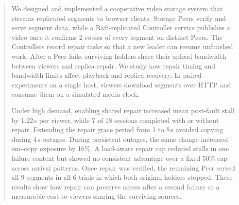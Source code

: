 \begin{abstract}
We designed and implemented a cooperative video storage system that
streams replicated segments to browser clients. Storage Peers verify
and serve segment data, while a Raft-replicated Controller service
publishes a video once it confirms 2 copies of every segment on distinct
Peers. The Controllers record repair tasks so that a new leader can
resume unfinished work. After a Peer fails, surviving holders share their
upload bandwidth between viewers and replica repair. We study how repair
timing and bandwidth limits affect playback and replica recovery.
In paired experiments on a single host, viewers download segments
over HTTP and consume them on a simulated media clock.

Under high demand, enabling shared repair increased mean post-fault stall
by 1.22\,s per viewer, while 7 of 18 sessions completed with or without
repair. Extending the repair grace period from 1 to 8\,s avoided copying
during 4\,s outages. During persistent outages, the same change increased
one-copy exposure by 16\%. A load-aware repair cap reduced stalls in one
failure context but showed no consistent advantage over a fixed 50\% cap
across arrival patterns. Once repair was verified, the remaining Peer
served all 9 segments in all 6 trials in which both original holders
stopped. These results show how repair can preserve access after a second
failure at a measurable cost to viewers sharing the surviving sources.
\end{abstract}
